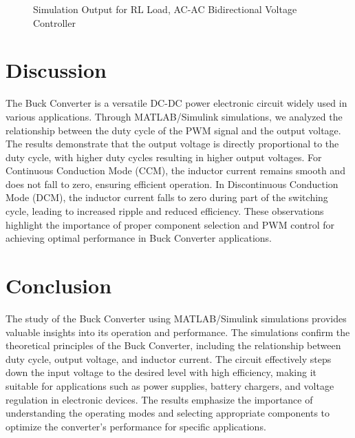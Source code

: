 \documentclass[12pt]{article}
\begin{document}
\begin{figure}[H]
    \centering
    \caption{Simulation Output for RL Load, AC-AC Bidirectional Voltage Controller}
    \label{fig:rlLoad}
\end{figure}


\section*{Discussion}
The Buck Converter is a versatile DC-DC power electronic circuit widely used in various applications. Through MATLAB/Simulink simulations, we analyzed the relationship between the duty cycle of the PWM signal and the output voltage. The results demonstrate that the output voltage is directly proportional to the duty cycle, with higher duty cycles resulting in higher output voltages. For Continuous Conduction Mode (CCM), the inductor current remains smooth and does not fall to zero, ensuring efficient operation. In Discontinuous Conduction Mode (DCM), the inductor current falls to zero during part of the switching cycle, leading to increased ripple and reduced efficiency. These observations highlight the importance of proper component selection and PWM control for achieving optimal performance in Buck Converter applications.

\section*{Conclusion}
The study of the Buck Converter using MATLAB/Simulink simulations provides valuable insights into its operation and performance. The simulations confirm the theoretical principles of the Buck Converter, including the relationship between duty cycle, output voltage, and inductor current. The circuit effectively steps down the input voltage to the desired level with high efficiency, making it suitable for applications such as power supplies, battery chargers, and voltage regulation in electronic devices. The results emphasize the importance of understanding the operating modes and selecting appropriate components to optimize the converter's performance for specific applications.


\renewcommand{\bibname}{References}

\end{document}
